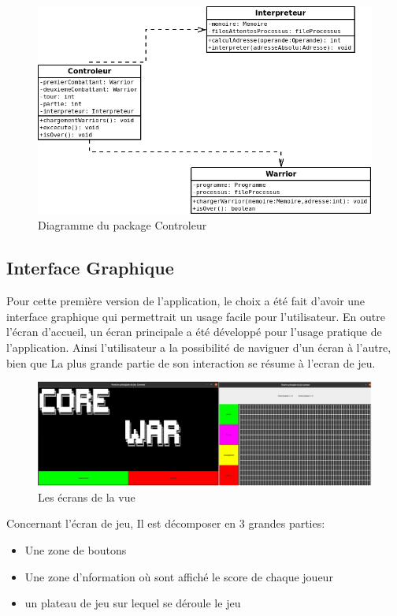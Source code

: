 \documentclass[12pt]{article}
\begin{document}
\begin{figure}[h]
	\includegraphics[scale=0.45]{Images/diagrammeControleur.png}
	\caption{Diagramme du package Controleur}
\end{figure}


\subsection{Interface Graphique}
Pour cette première version de l'application, le choix a été fait d'avoir une interface graphique qui
permettrait un usage facile pour l'utilisateur. En outre l'écran d'accueil, un écran principale a été développé
pour l'usage pratique de l'application. Ainsi l'utilisateur a la possibilité de naviguer d'un écran à l'autre, bien que La
plus grande partie de son interaction se résume à l'ecran de jeu.
\begin{figure}[h!]
	\includegraphics[scale = 0.27]{Images/ecransVue.png}
	\caption{Les écrans de la vue}
\end{figure}

Concernant l'écran de jeu, Il est décomposer en 3 grandes parties:

\begin{itemize}
	\item Une zone de boutons
	\item Une zone d'nformation où sont affiché le score de chaque joueur
	\item un plateau de jeu sur lequel se déroule le jeu
\end{itemize}
\end{document}
